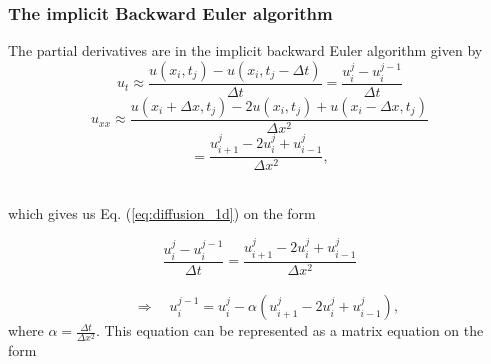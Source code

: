 \documentclass[12pt]{article}
\begin{document}
\begin{flushleft}
\subsubsection{The implicit Backward Euler algorithm\label{sect:bkwrd_Euler_algorithm}}
The partial derivatives are in the implicit backward Euler algorithm given by 
\vspace{5mm}
\begin{equation}\label{eq:backwrd_Euler_time}
u_t\approx\frac{u(x_i,t_j)-u(x_i,t_j-\Delta t)}{\Delta t}=\frac{u_i^{j}-u_i^{j-1}}{\Delta t} 
\end{equation}
\vspace{5mm}
\begin{equation}\label{eq:backwrd_Euler_space}
u_{xx}\approx \frac{u(x_i+\Delta x,t_j)-2u(x_i,t_j)+u(x_i-\Delta x,t_j)}{\Delta x^2}
\end{equation}
\vspace{5mm}
$$ =\frac{u_{i+1}^j-2u_i^j+u_{i-1}^j}{\Delta x^2},$$\\
\vspace{5mm}

which gives us Eq. (\ref{eq:diffusion_1d}) on the form

\vspace{5mm}
$$\frac{u_i^{j}-u_i^{j-1}}{\Delta t} = \frac{u_{i+1}^j-2u_i^j+u_{i-1}^j}{\Delta x^2}$$\\
\vspace{5mm}
\begin{equation}\label{eq:implicit_Euler_unknown}
\quad\Rightarrow\quad u_i^{j-1} = u_i^j - \alpha\left(u_{i+1}^j - 2u_i^j + u_{i-1}^j\right),
\end{equation}
\vspace{5mm}
where $\alpha = \frac{\Delta t}{\Delta x^2}$. This equation can be represented as a matrix equation on the form 


\end{flushleft}
\end{document}
